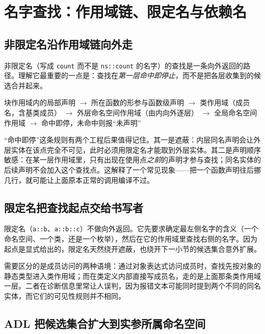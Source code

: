 \documentclass[12pt,a4paper,fontset=fandol]{ctexbook}
\newcommand{\Tp}[1]{\texttt{#1}}
\begin{document}
\section{名字查找：作用域链、限定名与依赖名}\label{sec:cl03-lookup}

\subsection{非限定名沿作用域链向外走}\label{sec:cl03-lookup-unqualified}

非限定名（写成 \Tp{count} 而不是 \Tp{ns::count} 的名字）的查找是一条向外返回的路径。理解它最重要的一点是：查找在\emph{第一层命中即停止}，而不是把各层收集到的候选合并起来。

\begin{flow}[title={非限定名的查找次序（函数体内的调用点）}]
块作用域内的局部声明 $\to$ 所在函数的形参与函数级声明 $\to$ 类作用域（成员名，含基类成员） $\to$ 外层命名空间作用域（由内向外逐层） $\to$ 全局命名空间作用域 $\to$ 命中即停，未命中则报“未声明”
\end{flow}

“命中即停”这条规则有两个工程后果值得记住。其一是遮蔽：内层同名声明会让外层实体在该点完全不可见，此时必须用限定名才能取到外层实体。其二是声明顺序敏感：在某一层作用域里，只有出现在使用点\emph{之前}的声明才参与查找；同名实体的后续声明不会加入这个查找点。这解释了一个常见现象——把一个函数声明往后挪几行，就可能让上面原本正常的调用编译不过。

\subsection{限定名把查找起点交给书写者}\label{sec:cl03-lookup-qualified}

限定名（\Tp{a::b}、\Tp{a::b::c}）不做向外返回。它先要求确定最左侧名字的含义（一个命名空间、一个类，还是一个枚举），然后在它的作用域里查找右侧的名字。因为起点是显式给出的，限定名天然绕开遮蔽，也绕开下一小节的候选集合意外扩展。

需要区分的是成员访问的两种语境：通过对象表达式访问成员时，查找先按对象的静态类型进入类作用域；而在类定义内部直接写成员名，走的是上面那条类作用域一层。二者在诊断信息里常让人误判，因为报错文本可能同时提到两个不同的同名实体，而它们的可见性规则并不相同。

\subsection{ADL 把候选集合扩大到实参所属命名空间}\label{sec:cl03-lookup-adl}
\end{document}
